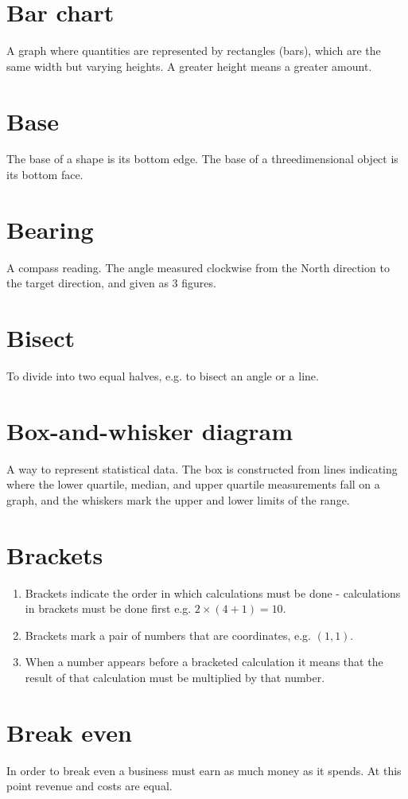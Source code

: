 \documentclass[10pt]{article}
\begin{document}
\section*{Bar chart}
A graph where quantities are represented by rectangles (bars), which are the same width but varying heights. A greater height means a greater amount.

\section*{Base}
The base of a shape is its bottom edge. The base of a threedimensional object is its bottom face.

\section*{Bearing}
A compass reading. The angle measured clockwise from the North direction to the target direction, and given as 3 figures.

\section*{Bisect}
To divide into two equal halves, e.g. to bisect an angle or a line.

\section*{Box-and-whisker diagram}
A way to represent statistical data. The box is constructed from lines indicating where the lower quartile, median, and upper quartile measurements fall on a graph, and the whiskers mark the upper and lower limits of the range.

\section*{Brackets}
\begin{enumerate}
  \item Brackets indicate the order in which calculations must be done - calculations in brackets must be done first e.g. $2 \times(4+1)=10$.
  \item Brackets mark a pair of numbers that are coordinates, e.g. $(1,1)$.
  \item When a number appears before a bracketed calculation it means that the result of that calculation must be multiplied by that number.
\end{enumerate}

\section*{Break even}
In order to break even a business must earn as much money as it spends. At this point revenue and costs are equal.
\end{document}
